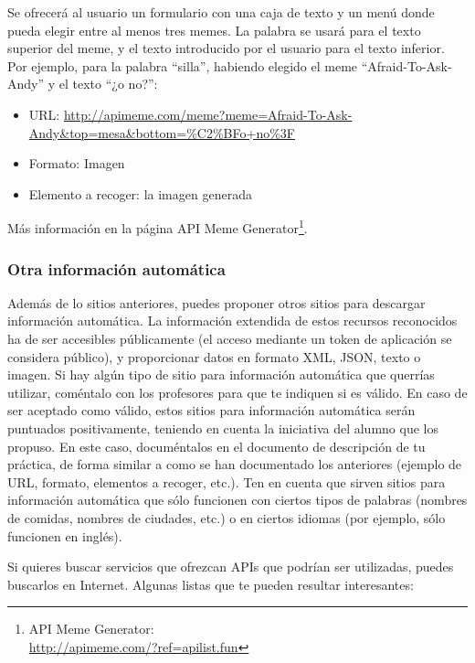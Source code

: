 Se ofrecerá al usuario un formulario con una caja de texto y un menú donde pueda elegir entre al menos tres memes. La palabra se usará para el texto superior del meme, y el texto introducido por el usuario para el texto inferior. Por ejemplo, para la palabra ``silla'', habiendo elegido el meme ``Afraid-To-Ask-Andy'' y el texto ``¿o no?'':

\begin{itemize}
\item URL: \url{http://apimeme.com/meme?meme=Afraid-To-Ask-Andy&top=mesa&bottom=%C2%BFo+no%3F}
\item Formato: Imagen
\item Elemento a recoger: la imagen generada
\end{itemize}

Más información en la página API Meme Generator\footnote{API Meme Generator: \\ \url{http://apimeme.com/?ref=apilist.fun}}.


\subsubsection{Otra información automática}


Además de lo sitios anteriores, puedes proponer otros sitios para descargar información automática. La información extendida de estos recursos reconocidos ha de ser accesibles públicamente (el acceso mediante un token de aplicación se considera público), y proporcionar datos en formato XML, JSON, texto o imagen. Si hay algún tipo de sitio para información automática que querrías utilizar, coméntalo con los profesores para que te indiquen si es válido. En caso de ser aceptado como válido, estos sitios para información automática serán puntuados positivamente, teniendo en cuenta la iniciativa del alumno que los propuso. En este caso, documéntalos en el documento de descripción de tu práctica, de forma similar a como se han documentado los anteriores (ejemplo de URL, formato, elementos a recoger, etc.). Ten en cuenta que sirven sitios para información automática que sólo funcionen con ciertos tipos de palabras (nombres de comidas, nombres de ciudades, etc.) o en ciertos idiomas (por ejemplo, sólo funcionen en inglés).

Si quieres buscar servicios que ofrezcan APIs que podrían ser utilizadas, puedes buscarlos en Internet. Algunas listas que te pueden resultar interesantes:

